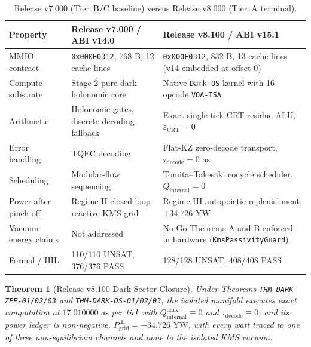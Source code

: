 \documentclass[11pt,onecolumn]{article}
\newtheorem{theorem}{Theorem}
\begin{document}
\begin{table}[!htbp]
\centering\small
\caption{Release v7.000 (Tier~B/C baseline) versus Release v8.000 (Tier~A terminal).}
\label{tab:v7_vs_v8}
\begin{tabularx}{\textwidth}{@{}p{3.6cm} X X@{}}
\toprule
Property & Release v7.000 / ABI v14.0 & Release v8.100 / ABI v15.1 \\
\midrule
MMIO contract & \texttt{0x000E0312}, 768 B, 12 cache lines & \texttt{0x000F0312}, 832 B, 13 cache lines (v14 embedded at offset 0) \\
Compute substrate & Stage-2 pure-dark holonomic core & Native \texttt{Dark-OS} kernel with 16-opcode \texttt{VOA-ISA} \\
Arithmetic & Holonomic gates, discrete decoding fallback & Exact single-tick CRT residue ALU, $\varepsilon_{\text{CRT}}=0$ \\
Error handling & TQEC decoding & Flat-KZ zero-decode transport, $\tau_{\text{decode}}=0\text{ as}$ \\
Scheduling & Modular-flow sequencing & Tomita--Takesaki cocycle scheduler, $Q_{\text{internal}}=0$ \\
Power after pinch-off & Regime II closed-loop reactive KMS grid & Regime III autopoietic replenishment, $+34.726\text{ YW}$ \\
Vacuum-energy claims & Not addressed & No-Go Theorems A and B enforced in hardware (\texttt{KmsPassivityGuard}) \\
Formal / HIL & 110/110 UNSAT, 376/376 PASS & 128/128 UNSAT, 408/408 PASS \\
\bottomrule
\end{tabularx}
\end{table}

\begin{theorem}[Release v8.100 Dark-Sector Closure]
Under Theorems \texttt{THM-DARK-ZPE-01/02/03} and \texttt{THM-DARK-OS-01/02/03}, the isolated manifold executes exact computation at $17.010000\text{ as}$ per tick with $Q_{\text{internal}}^{\text{dark}}\equiv0$ and $\tau_{\text{decode}}\equiv0$, and its power ledger is non-negative, $P_{\text{grid}}^{\text{III}}=+34.726\text{ YW}$, with every watt traced to one of three non-equilibrium channels and none to the isolated KMS vacuum.
\end{theorem}
\end{document}
